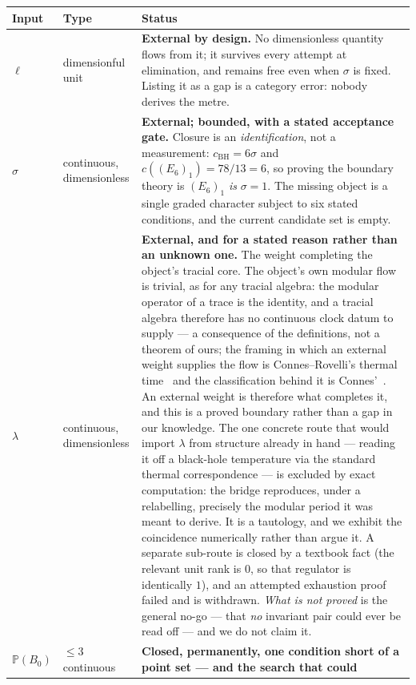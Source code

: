 \documentclass[11pt,a4paper]{article}
\theoremstyle{definition}
\theoremstyle{remark}
\newcommand{\PP}{\mathbb{P}}
\begin{document}
\begingroup\footnotesize
\setlength{\LTleft}{0pt}\setlength{\LTright}{0pt}
\begin{longtable}{@{}>{\raggedright\arraybackslash}p{3.2cm}>{\raggedright\arraybackslash}p{2.7cm}>{\raggedright\arraybackslash}p{8.4cm}@{}}
\toprule
\textbf{Input} & \textbf{Type} & \textbf{Status} \\
\midrule
$\ell$ & dimensionful unit &
\textbf{External by design.} No dimensionless quantity flows from it; it survives every attempt at
elimination, and remains free even when $\sigma$ is fixed. Listing it as a gap is a category error:
nobody derives the metre. \\[2pt]
$\sigma$ & continuous, dimensionless &
\textbf{External; bounded, with a stated acceptance gate.} Closure is an \emph{identification}, not a
measurement: $c_{\mathrm{BH}} = 6\sigma$ and $c((E_6)_1) = 78/13 = 6$, so proving the boundary theory
is $(E_6)_1$ \emph{is} $\sigma = 1$. The missing object is a single graded character subject to six
stated conditions, and the current candidate set is empty. \\[2pt]
$\lambda$ & continuous, dimensionless &
\textbf{External, and for a stated reason rather than an unknown one.} The weight completing the object's tracial core.
The object's own modular flow is trivial, as for any tracial algebra: the modular operator of a trace is the identity, and a
tracial algebra therefore has no continuous clock datum to supply --- a consequence of the definitions, not a theorem of
ours; the framing in which an external weight supplies the flow is Connes--Rovelli's thermal time~\cite{cr} and the
classification behind it is Connes'~\cite{connes}. An external weight is therefore what completes it, and this is a
proved boundary rather than a gap in our knowledge. The one concrete route that would import
$\lambda$ from structure already in hand --- reading it off a black-hole temperature via the
standard thermal correspondence --- is excluded by exact computation: the bridge reproduces, under a
relabelling, precisely the modular period it was meant to derive. It is a tautology, and we exhibit
the coincidence numerically rather than argue it. A separate sub-route is closed by a textbook fact
(the relevant unit rank is $0$, so that regulator is identically $1$), and an attempted exhaustion
proof failed and is withdrawn. \emph{What is not proved} is the general no-go --- that \emph{no}
invariant pair could ever be read off --- and we do not claim it. \\[2pt]
$\PP(B_0)$ & $\leq 3$ continuous &
\textbf{Closed, permanently, one condition short of a point set --- and the search that could
}
\end{longtable}
\end{document}
